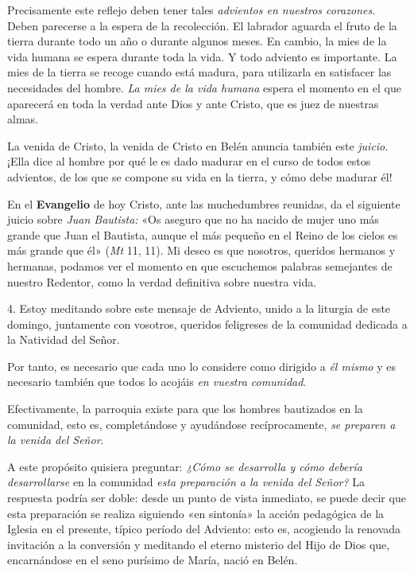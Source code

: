 \begin{body}
					Precisamente este reflejo deben tener tales \emph{advientos en nuestros corazones}. Deben parecerse a la espera de la recolección. El labrador aguarda el fruto de la tierra durante todo un año o durante algunos meses. En cambio, la mies de la vida humana se espera durante toda la vida. Y todo adviento es importante. La mies de la tierra se recoge cuando está madura, para utilizarla en satisfacer las necesidades del hombre. \emph{La mies de la vida humana} espera el momento en el que aparecerá en toda la verdad ante Dios y ante Cristo, que es juez de nuestras almas.
					
					La venida de Cristo, la venida de Cristo en Belén anuncia también este \emph{juicio}. ¡Ella dice al hombre por qué le es dado madurar en el curso de todos estos advientos, de los que se compone su vida en la tierra, y cómo debe madurar él!
					
					En el \textbf{Evangelio} de hoy Cristo, ante las muchedumbres reunidas, da el siguiente juicio sobre \emph{Juan Bautista:} «Os aseguro que no ha nacido de mujer uno más grande que Juan el Bautista, aunque el más pequeño en el Reino de los cielos es más grande que él» (\emph{Mt} 11, 11). Mi deseo es que nosotros, queridos hermanos y hermanas, podamos ver el momento en que escuchemos palabras semejantes de nuestro Redentor, como la verdad definitiva sobre nuestra vida.
					
					4. Estoy meditando sobre este mensaje de Adviento, unido a la liturgia de este domingo, juntamente con vosotros, queridos feligreses de la comunidad dedicada a la Natividad del Señor.
					
					Por tanto, es necesario que cada uno lo considere como dirigido a \emph{él mismo} y es necesario también que todos lo acojáis \emph{en vuestra comunidad}.
					
					Efectivamente, la parroquia existe para que los hombres bautizados en la comunidad, esto es, completándose y ayudándose recíprocamente, \emph{se preparen a la venida del Señor}.
					
					A este propósito quisiera preguntar: \emph{¿Cómo se desarrolla y cómo debería desarrollarse} en la comunidad \emph{esta preparación a la venida del Señor?} La respuesta podría ser doble: desde un punto de vista inmediato, se puede decir que esta preparación se realiza siguiendo «en sintonía» la acción pedagógica de la Iglesia en el presente, típico período del Adviento: esto es, acogiendo la renovada invitación a la conversión y meditando el eterno misterio del Hijo de Dios que, encarnándose en el seno purísimo de María, nació en Belén. 
					

\end{body}
